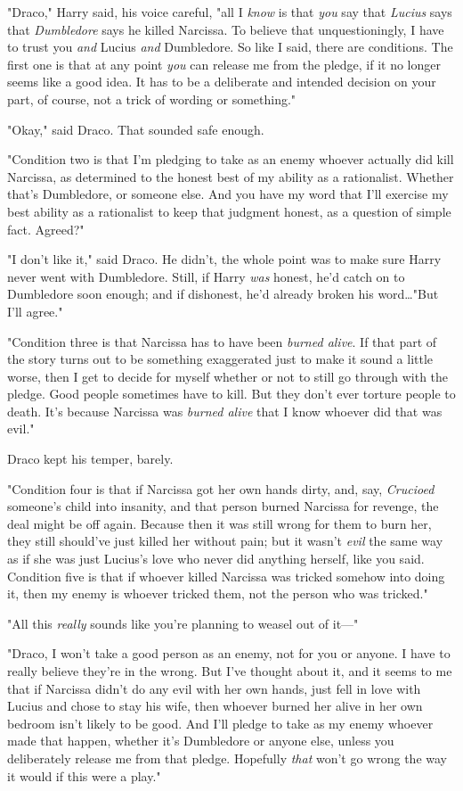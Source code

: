"Draco," Harry said, his voice careful, "all I \emph{know} is that \emph{you}
say that \emph{Lucius} says that \emph{Dumbledore} says he killed Narcissa. To
believe that unquestioningly, I have to trust you \emph{and} Lucius \emph{and}
Dumbledore. So like I said, there are conditions. The first one is that at any
point \emph{you} can release me from the pledge, if it no longer seems like a
good idea. It has to be a deliberate and intended decision on your part, of
course, not a trick of wording or something."

"Okay," said Draco. That sounded safe enough.

"Condition two is that I’m pledging to take as an enemy whoever actually did
kill Narcissa, as determined to the honest best of my ability as a rationalist.
Whether that’s Dumbledore, or someone else. And you have my word that I’ll
exercise my best ability as a rationalist to keep that judgment honest, as a
question of simple fact. Agreed?"

"I don’t like it," said Draco. He didn’t, the whole point was to make sure
Harry never went with Dumbledore. Still, if Harry \emph{was} honest, he’d catch
on to Dumbledore soon enough; and if dishonest, he’d already broken his
word…"But I’ll agree."

"Condition three is that Narcissa has to have been \emph{burned alive}. If that
part of the story turns out to be something exaggerated just to make it sound a
little worse, then I get to decide for myself whether or not to still go
through with the pledge. Good people sometimes have to kill. But they don’t
ever torture people to death. It’s because Narcissa was \emph{burned alive}
that I know whoever did that was evil."

Draco kept his temper, barely.

"Condition four is that if Narcissa got her own hands dirty, and, say,
\emph{Crucioed} someone’s child into insanity, and that person burned Narcissa
for revenge, the deal might be off again. Because then it was still wrong for
them to burn her, they still should’ve just killed her without pain; but it
wasn’t \emph{evil} the same way as if she was just Lucius’s love who never did
anything herself, like you said. Condition five is that if whoever killed
Narcissa was tricked somehow into doing it, then my enemy is whoever tricked
them, not the person who was tricked."

"All this \emph{really} sounds like you’re planning to weasel out of it—"

"Draco, I won’t take a good person as an enemy, not for you or anyone. I have
to really believe they’re in the wrong. But I’ve thought about it, and it seems
to me that if Narcissa didn’t do any evil with her own hands, just fell in love
with Lucius and chose to stay his wife, then whoever burned her alive in her
own bedroom isn’t likely to be good. And I’ll pledge to take as my enemy
whoever made that happen, whether it’s Dumbledore or anyone else, unless you
deliberately release me from that pledge. Hopefully \emph{that} won’t go wrong
the way it would if this were a play."

